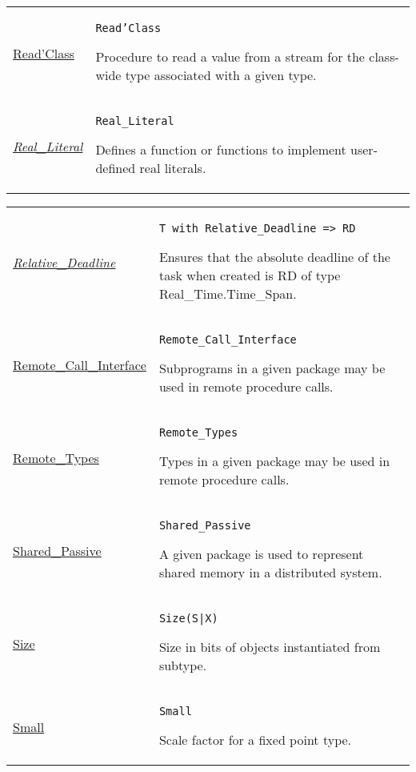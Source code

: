 \documentclass[english]{article}
\begin{document}
\begin{scriptsize}
\begin{multicols*}{3}
\begin{tabular}{@{}p{2cm}p{6.5cm}}
   \href{http://www.ada-auth.org/standards/22rm/html/RM-13-13-2.html}{Read'Class} & \texttt{Read'Class}

   Procedure to read a value from a stream for the class-wide type associated with a given type.\\

   \href{http://www.ada-auth.org/standards/22rm/html/RM-4-2-1.html}{\textit{Real\_Literal}} & \texttt{Real\_Literal}

   Defines a function or functions to implement user-defined real literals.\\

\end{tabular}
\begin{tabular}{@{}p{2cm}p{6.5cm}}

   \href{http://www.ada-auth.org/standards/22rm/html/RM-D-2-6.html}{\textit{Relative\_Deadline}} & \texttt{T with Relative\_Deadline => RD}

   Ensures that the absolute deadline of the task when created is RD of type Real\_Time.Time\_Span.\\

   \href{http://www.ada-auth.org/standards/22rm/html/RM-E-2-3.html}{Remote\_Call\_Interface} & \texttt{Remote\_Call\_Interface}

   Subprograms in a given package may be used in remote procedure calls. \\

   \href{http://www.ada-auth.org/standards/22rm/html/RM-E-2-2.html}{Remote\_Types} & \texttt{Remote\_Types}

   Types in a given package may be used in remote procedure calls.\\

   \href{http://www.ada-auth.org/standards/22rm/html/RM-E-2-1.html}{Shared\_Passive} & \texttt{Shared\_Passive}

   A given package is used to represent shared memory in a distributed system.\\

   \href{http://www.ada-auth.org/standards/22rm/html/RM-13-3.html}{Size} & \texttt{Size(S|X)}

   Size in bits of objects instantiated from subtype.\\

   \href{http://www.ada-auth.org/standards/22rm/html/RM-3-5-10.html}{Small} & \texttt{Small}

   Scale factor for a fixed point type.\\


\end{tabular}
\end{multicols*}
\end{scriptsize}
\end{document}
